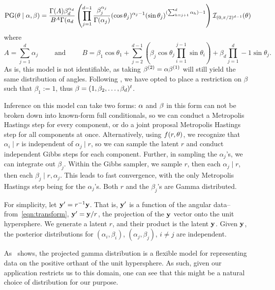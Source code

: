 \begin{equation}
    \text{PG}({\bf \theta}\mid{\bf \alpha},{\bf \beta}) = \frac{\Gamma(A)\beta_d^{\alpha_d}}{B^A\Gamma(a_d}\left(\prod_{j = 1}^{d-1}\frac{\beta_j^{\alpha_j}}{\Gamma(\alpha_j)}(\cos\theta_j)^{\alpha_j - 1}(\sin\theta_j)^{(\sum_{h = j + 1}^d\alpha_h) - 1}\right)\mathcal{I}_{(0,\pi/2)^{d-1}}({\bf \theta})
\end{equation}
where
\begin{equation}
    A = \sum_{j = 1}^d\alpha_j \hspace{1cm}\text{and}\hspace{1cm}B = \beta_1\cos\theta_1 + \sum_{j = 2}^{d-1}\left(\beta_j\cos\theta_j\prod_{i = 1}^{j-1}\sin\theta_i\right) + \beta_d\prod_{j = 1}^d-1\sin\theta_j.
\end{equation}
As is, this model is not identifiable, as taking
  ${\bf \beta}^{(2)} = \alpha {\bf \beta}^{(1)}$ will still yield the same
  distribution of angles. Following \cite{nunez2019}, we have opted to place a
  restriction on $\beta$ such that $\beta_1 := 1$, thus
  ${\bf \beta} = (1, \beta_2, \ldots, \beta_d)^t$.

Inference on this model can take two forms: ${\bf \alpha}$ and ${\bf \beta}$ in
  this form can not be broken down into known-form full conditionals, so we can
  conduct a Metropolis Hastings step for every component, or do a joint proposal
  Metropolis Hastings step for all components at once.  Alternatively, using
  $f(r,{\bf \theta})$, we recognize that $\alpha_i\mid r$ is independent of
  $\alpha_j\mid r$, so we can sample the latent $r$ and conduct independent
  Gibbs steps for each component.  Further, in sampling the $\alpha_j$'s, we can
  integrate out $\beta_j$. Within the Gibbs sampler, we sample $r$, then each
  $\alpha_j\mid r$, then each $\beta_j\mid r, \alpha_j$.  This leads to fast
  convergence, with the only Metropolis Hastings step being for the
  $\alpha_j$'s.  Both $r$ and the $\beta_j$'s are Gamma distributed.

For simplicity, let ${\bf y^{\prime}} = r^{-1}{\bf y}$.  That is,
  ${\bf y^{\prime}}$ is a function of the angular data--from~\eqref{eqn:transform},
  ${\bf y^{\prime}} = {\bf y}/r$, the projection of the ${\bf y}$ vector onto
  the unit hypersphere. We generate a latent $r$, and their product is the
  latent ${\bf y}$.  Given ${\bf y}$, the posterior distributions for
  $(\alpha_i, \beta_i)$, $(\alpha_j,\beta_j)$, $i\neq j$ are independent.

As~\cite{nunez2019} shows, the projected gamma distribution is a flexible model
  for representing data on the positive orthant of the unit hypersphere.  As such,
  given our application restricts us to this domain, one can see that this might be a
  natural choice of distribution for our purpose.

